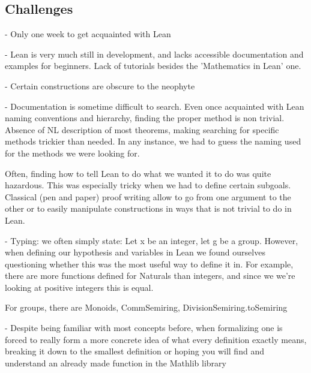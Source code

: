 \subsection{Challenges}


- Only one week to get acquainted with Lean

- Lean is very much still in development, and lacks accessible documentation and examples for beginners. Lack of tutorials besides the 'Mathematics in Lean' one.

- Certain constructions are obscure to the neophyte

- Documentation is sometime difficult to search. Even once acquainted with Lean naming conventions and hierarchy, finding the proper method is non trivial.
Absence of NL description of most theorems, making searching for specific methods trickier than needed. In any instance, we had to guess the naming used for the methods we were looking for. 

Often, finding how to tell Lean to do what we wanted it to do was quite hazardous. This was especially tricky when  we had to define certain subgoals. Classical (pen and paper) proof writing allow to go from one argument to the other or to easily manipulate constructions in ways that is not trivial to do in Lean.



- Typing: we often simply state: Let x be an integer, let g be a group.
However, when defining our hypothesis and variables in Lean we found ourselves questioning whether this was the most useful way to define it in. For example, there are more functions defined for Naturals than integers, and since we we're looking at positive integers this is equal.

For groups, there are Monoids, CommSemiring, DivisionSemiring.toSemiring 

- Despite being familiar with most concepts before, when formalizing one is forced to really form a more concrete idea of what every definition exactly means, breaking it down to the smallest definition or hoping you will find and understand an already made function in the Mathlib library 